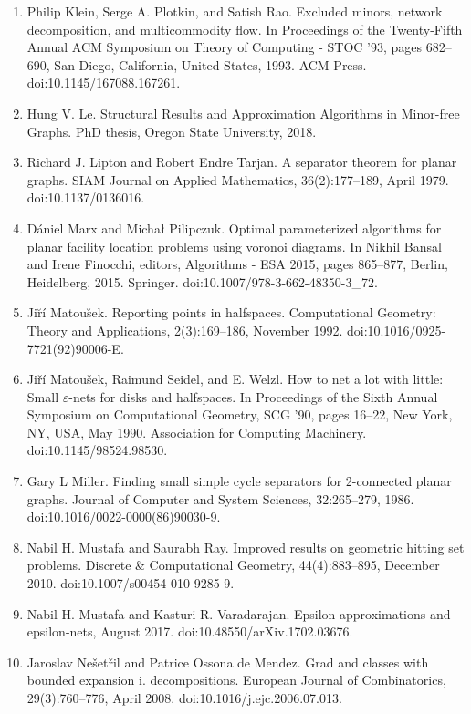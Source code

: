 \begin{enumerate}
\item[]  [41]  Philip Klein, Serge A. Plotkin, and Satish Rao.  Excluded minors, network decomposition, and multicommodity flow.  In Proceedings of the Twenty-Fifth Annual ACM Symposium on Theory of Computing - STOC ’93, pages 682–690, San Diego, California, United States, 1993. ACM Press.  doi:10.1145/167088.167261.  
\item[]  [42]  Hung V. Le.  Structural Results and Approximation Algorithms in Minor-free Graphs.  PhD thesis, Oregon State University, 2018.  
\item[]  [43]  Richard J. Lipton and Robert Endre Tarjan.  A separator theorem for planar graphs.  SIAM Journal on Applied Mathematics, 36(2):177–189, April 1979.  doi:10.1137/0136016.  
\item[]  [44]  Dániel Marx and Michał Pilipczuk.  Optimal parameterized algorithms for planar facility location problems using voronoi diagrams.  In Nikhil Bansal and Irene Finocchi, editors, Algorithms - ESA 2015, pages 865–877, Berlin, Heidelberg, 2015. Springer.  doi:10.1007/978-3-662-48350-3\_72.  
\item[]  [45]  Jir̆í Matous̆ek.  Reporting points in halfspaces.  Computational Geometry: Theory and Applications, 2(3):169–186, November 1992.  doi:10.1016/0925-7721(92)90006-E.  
\item[]  [46]  Jiří Matoušek, Raimund Seidel, and E. Welzl.  How to net a lot with little: Small $\varepsilon$-nets for disks and halfspaces.  In Proceedings of the Sixth Annual Symposium on Computational Geometry, SCG ’90, pages 16–22, New York, NY, USA, May 1990. Association for Computing Machinery.  doi:10.1145/98524.98530.  
\item[]  [47]  Gary L Miller.  Finding small simple cycle separators for 2-connected planar graphs.  Journal of Computer and System Sciences, 32:265–279, 1986.  doi:10.1016/0022-0000(86)90030-9.  
\item[]  [48]  Nabil H. Mustafa and Saurabh Ray.  Improved results on geometric hitting set problems.  Discrete \& Computational Geometry, 44(4):883–895, December 2010.  doi:10.1007/s00454-010-9285-9.  
\item[]  [49]  Nabil H. Mustafa and Kasturi R. Varadarajan.  Epsilon-approximations and epsilon-nets, August 2017.  doi:10.48550/arXiv.1702.03676.  
\item[]  [50]  Jaroslav Nešetřil and Patrice Ossona de Mendez.  Grad and classes with bounded expansion i. decompositions.  European Journal of Combinatorics, 29(3):760–776, April 2008.  doi:10.1016/j.ejc.2006.07.013.  

\end{enumerate}
